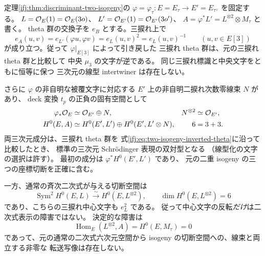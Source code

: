 \begin{proposition}
\label{ifj:prop:two-isogeny-theta-characters}
定理\ref{ifj:thm:discriminant-two-isogeny}の
$\varphi=\varphi_\tau:E=E_\tau\to E'=E_{\tau^\vee}$ を固定する。
$L=\mathcal O_E(1)=\mathcal O_E(3o)$、
$L'=\mathcal O_{E'}(1)=\mathcal O_{E'}(3o')$、
$A=\varphi^*L'=L^{\otimes2}\otimes M_\tau$ と書く。
theta 群の交換子を $e_B$ とする。三捩れ上で
\begin{equation}\label{ifj:eq:two-isogeny-inverted-theta}
 e_A(u,v)=e_{L'}(\varphi u,\varphi v)
           =e_L(u,v)^2=e_L(u,v)^{-1}
 \qquad(u,v\in E[3])
\end{equation}
が成り立つ。従って $\varphi|_{E[3]}$ によって引き戻した
三捩れ theta 群は、元の三捩れ theta 群と比較して
中央 $\mu_3$ の文字が逆である。
同じ三捩れ標識と中央文字をともに恒等に保つ
三次元の線型 intertwiner は存在しない。

さらに $\varphi$ の非自明な被覆文字に対応する
$E'$ 上の非自明二捩れ次数零線束 $N$ があり、
deck 変換 $t_p$ の正負の固有空間として
\begin{equation}\label{ifj:eq:two-isogeny-six-sections}
 \begin{aligned}
 \varphi_*\mathcal O_E&\simeq\mathcal O_{E'}\oplus N,
                           &N^{\otimes2}&\simeq\mathcal O_{E'},\\
 H^0(E,A)&\simeq H^0(E',L')
             \oplus H^0(E',L'\otimes N),
                           &6&=3+3.
 \end{aligned}
\end{equation}
両三次元成分は、三捩れ theta 群を
式\eqref{ifj:eq:two-isogeny-inverted-theta}に沿って比較したとき、
標準の三次元 Schr\"odinger 表現の双対型となる
（線型化の文字の選択は許す）。
最初の成分は $\varphi^*H^0(E',L')$ であり、
元の二重 isogeny の三つの座標切断を正確に含む。

一方、通常の斉次二次式が与える切断空間は
\[
 \operatorname{Sym}^2H^0(E,L)
         \xrightarrow{\sim}H^0(E,L^{\otimes2}),\qquad
 \dim H^0(E,L^{\otimes2})=6
\]
であり、こちらの三捩れ中心文字も $e_L^2$ である。
従って中心文字の反転\emph{だけ}は二次式表示の障害ではない。
決定的な障害は
\begin{equation}\label{ifj:eq:two-isogeny-no-quadratic-transfer}
 \operatorname{Hom}_E(L^{\otimes2},A)
       =H^0(E,M_\tau)=0
\end{equation}
であって、元の通常の二次式六次元空間から
isogeny の切断空間への、線束と両立する非零な
転送写像は存在しない。
\end{proposition}

